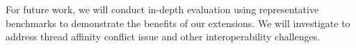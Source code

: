 For future work, we will conduct in-depth evaluation using representative benchmarks to demonstrate the benefits of our extensions.
We will investigate to address thread affinity conflict issue and other interoperability challenges. %
